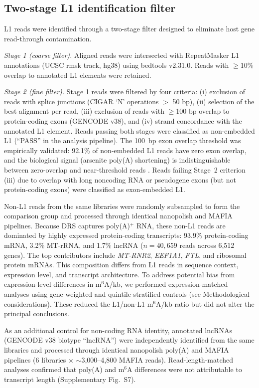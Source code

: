 \documentclass[11pt]{article}
\newcommand{\msix}{m$^6$A}
\begin{document}
\subsection*{Two-stage L1 identification filter}

L1 reads were identified through a two-stage filter designed to
eliminate host gene read-through contamination.

\emph{Stage 1 (coarse filter).} Aligned reads were intersected with
RepeatMasker L1 annotations (UCSC rmsk track, hg38) using bedtools
v2.31.0. Reads with $\geq$10\% overlap to annotated L1 elements were
retained.

\emph{Stage 2 (fine filter).} Stage 1 reads were filtered by four
criteria: (i) exclusion of reads with splice junctions (CIGAR `N'
operations $>$ 50 bp), (ii) selection of the best alignment per read,
(iii) exclusion of reads with $\geq$100 bp overlap to protein-coding
exons (GENCODE v38), and (iv) strand concordance with the annotated L1
element. Reads passing both stages were classified as non-embedded L1
(``PASS'' in the analysis pipeline). The 100~bp exon overlap threshold
was empirically validated: 92.1\% of non-embedded L1 reads have zero exon
overlap, and the biological signal (arsenite poly(A) shortening) is
indistinguishable between zero-overlap and near-threshold reads
. Reads failing Stage~2 criterion (iii) due to
overlap with long noncoding RNA or pseudogene exons (but not
protein-coding exons) were classified as exon-embedded L1.

Non-L1 reads from the same libraries were randomly subsampled to form
the comparison group and processed through identical nanopolish and
MAFIA pipelines. Because DRS captures poly(A)$^+$ RNA, these non-L1 reads
are dominated by highly expressed protein-coding transcripts: 93.9\%
protein-coding mRNA, 3.2\% MT-rRNA, and 1.7\% lncRNA ($n = 40{,}659$
reads across 6,512 genes). The top contributors include \emph{MT-RNR2},
\emph{EEF1A1}, \emph{FTL}, and ribosomal protein mRNAs. This composition
differs from L1 reads in sequence context, expression level, and
transcript architecture. To address potential bias from
expression-level differences in \msix{}/kb, we performed
expression-matched analyses using gene-weighted and
quintile-stratified controls (see Methodological considerations). These
reduced the L1/non-L1 \msix{}/kb ratio but did not alter the principal
conclusions.

As an additional control for non-coding RNA identity, annotated lncRNAs
(GENCODE v38 biotype ``lncRNA'') were independently identified from the
same libraries and processed through identical nanopolish poly(A) and
MAFIA pipelines (6 libraries $\times$ $\sim$3{,}000--4{,}800 MAFIA reads).
Read-length-matched analyses confirmed that poly(A) and \msix{}
differences were not attributable to transcript length
(Supplementary Fig.~S7).
\end{document}

